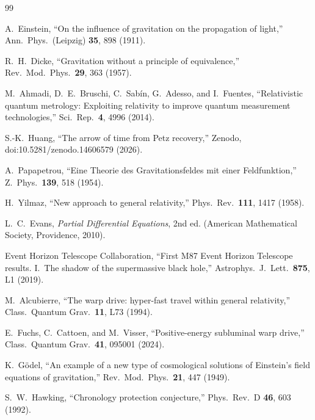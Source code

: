 \documentclass[12pt]{article}
\renewcommand{\baselinestretch}{2.0}
\begin{document}
\newpage
\label{refs_start}
\begingroup\sloppy
\renewcommand{\baselinestretch}{1.2}\selectfont
\begin{thebibliography}{99}

A.~Einstein,
``On the influence of gravitation on the propagation of light,''
Ann.\ Phys.\ (Leipzig) \textbf{35}, 898 (1911).

R.~H.~Dicke,
``Gravitation without a principle of equivalence,''
Rev.\ Mod.\ Phys.\ \textbf{29}, 363 (1957).

M.~Ahmadi, D.~E.~Bruschi, C.~Sab\'{i}n, G.~Adesso, and I.~Fuentes,
``Relativistic quantum metrology: Exploiting relativity to improve quantum
measurement technologies,''
Sci.\ Rep.\ \textbf{4}, 4996 (2014).

S.-K.~Huang,
``The arrow of time from Petz recovery,''
Zenodo, doi:10.5281/zenodo.14606579 (2026).

A.~Papapetrou,
``Eine Theorie des Gravitationsfeldes mit einer Feldfunktion,''
Z.\ Phys.\ \textbf{139}, 518 (1954).

H.~Yilmaz,
``New approach to general relativity,''
Phys.\ Rev.\ \textbf{111}, 1417 (1958).

L.~C.~Evans,
\emph{Partial Differential Equations}, 2nd ed.
(American Mathematical Society, Providence, 2010).

Event Horizon Telescope Collaboration,
``First M87 Event Horizon Telescope results. I.\ The shadow of the
supermassive black hole,''
Astrophys.\ J.\ Lett.\ \textbf{875}, L1 (2019).

M.~Alcubierre,
``The warp drive: hyper-fast travel within general relativity,''
Class.\ Quantum Grav.\ \textbf{11}, L73 (1994).

E.~Fuchs, C.~Cattoen, and M.~Visser,
``Positive-energy subluminal warp drive,''
Class.\ Quantum Grav.\ \textbf{41}, 095001 (2024).

K.~G\"odel,
``An example of a new type of cosmological solutions of Einstein's field
equations of gravitation,''
Rev.\ Mod.\ Phys.\ \textbf{21}, 447 (1949).

S.~W.~Hawking,
``Chronology protection conjecture,''
Phys.\ Rev.\ D \textbf{46}, 603 (1992).


\end{thebibliography}
\end{document}
